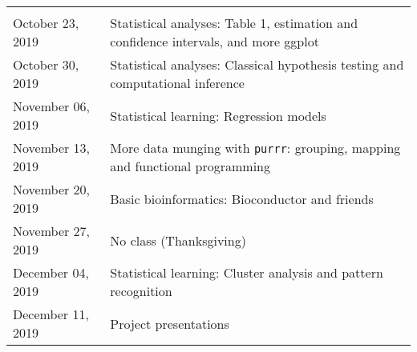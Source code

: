 \documentclass[
]{article}
\begin{document}
\begin{longtable}[]{@{}ll@{}}
\begin{minipage}[t]{0.77\columnwidth}
\end{minipage}\tabularnewline
\begin{minipage}[t]{0.17\columnwidth}\raggedright
October 23, 2019\strut
\end{minipage} & \begin{minipage}[t]{0.77\columnwidth}\raggedright
Statistical analyses: Table 1, estimation and confidence intervals, and
more ggplot\strut
\end{minipage}\tabularnewline
\begin{minipage}[t]{0.17\columnwidth}\raggedright
October 30, 2019\strut
\end{minipage} & \begin{minipage}[t]{0.77\columnwidth}\raggedright
Statistical analyses: Classical hypothesis testing and computational
inference\strut
\end{minipage}\tabularnewline
\begin{minipage}[t]{0.17\columnwidth}\raggedright
November 06, 2019\strut
\end{minipage} & \begin{minipage}[t]{0.77\columnwidth}\raggedright
Statistical learning: Regression models\strut
\end{minipage}\tabularnewline
\begin{minipage}[t]{0.17\columnwidth}\raggedright
November 13, 2019\strut
\end{minipage} & \begin{minipage}[t]{0.77\columnwidth}\raggedright
More data munging with \texttt{purrr}: grouping, mapping and functional
programming\strut
\end{minipage}\tabularnewline
\begin{minipage}[t]{0.17\columnwidth}\raggedright
November 20, 2019\strut
\end{minipage} & \begin{minipage}[t]{0.77\columnwidth}\raggedright
Basic bioinformatics: Bioconductor and friends\strut
\end{minipage}\tabularnewline
\begin{minipage}[t]{0.17\columnwidth}\raggedright
November 27, 2019\strut
\end{minipage} & \begin{minipage}[t]{0.77\columnwidth}\raggedright
No class (Thanksgiving)\strut
\end{minipage}\tabularnewline
\begin{minipage}[t]{0.17\columnwidth}\raggedright
December 04, 2019\strut
\end{minipage} & \begin{minipage}[t]{0.77\columnwidth}\raggedright
Statistical learning: Cluster analysis and pattern recognition\strut
\end{minipage}\tabularnewline
\begin{minipage}[t]{0.17\columnwidth}\raggedright
December 11, 2019\strut
\end{minipage} & \begin{minipage}[t]{0.77\columnwidth}\raggedright
Project presentations\strut
\end{minipage}\tabularnewline
\bottomrule
\end{longtable}
\end{document}
